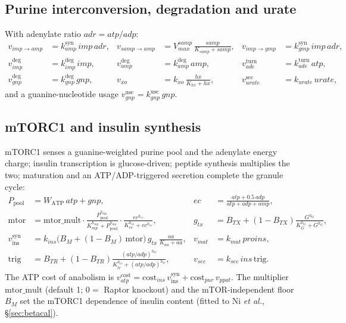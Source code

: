 \documentclass[11pt]{article}
\begin{document}
\subsection{Purine interconversion, degradation and urate}
With adenylate ratio $adr=atp/adp$:
\begin{align}
v_{imp\to amp}&=k_{amp}^{\mathrm{syn}}\,imp\,adr, &
v_{samp\to amp}&=V_{max}^{samp}\,\frac{samp}{K_{samp}+samp}, &
v_{imp\to gmp}&=k_{gmp}^{\mathrm{syn}}\,imp\,adr,\\
v_{imp}^{\mathrm{deg}}&=k_{imp}^{\mathrm{deg}}\,imp, &
v_{amp}^{\mathrm{deg}}&=k_{amp}^{\mathrm{deg}}\,amp, &
v_{ade}^{\mathrm{turn}}&=k_{ade}^{\mathrm{turn}}\,atp,\\
v_{gnp}^{\mathrm{deg}}&=k_{gnp}^{\mathrm{deg}}\,gnp, &
v_{xo}&=k_{xo}\,\frac{hx}{K_{hx}+hx}, &
v_{urate}^{\mathrm{sec}}&=k_{urate}\,urate,
\end{align}
and a guanine-nucleotide usage $v_{gnp}^{\mathrm{use}}=k_{gnp}^{\mathrm{use}}\,gnp$.

\subsection{mTORC1 and insulin synthesis}
mTORC1 senses a guanine-weighted purine pool and the adenylate energy charge;
insulin transcription is glucose-driven; peptide synthesis multiplies the two;
maturation and an ATP/ADP-triggered secretion complete the granule cycle:
\begin{align}
P_{\mathrm{pool}}&=W_{\mathrm{ATP}}\,atp+gnp, &
ec&=\frac{atp+0.5\,adp}{atp+adp+amp},\\
\mathrm{mtor}&=\mathrm{mtor\_mult}\cdot
\frac{P_{\mathrm{pool}}^{h_{mp}}}{K_{mp}^{h_{mp}}+P_{\mathrm{pool}}^{h_{mp}}}\cdot
\frac{ec^{h_{ec}}}{K_{ec}^{h_{ec}}+ec^{h_{ec}}}, &
g_{tx}&=B_{TX}+(1-B_{TX})\frac{G^{h_G}}{K_{G}^{h_G}+G^{h_G}},\\
v_{\mathrm{ins}}^{\mathrm{syn}}&=k_{ins}\big(B_{M}+(1-B_{M})\,\mathrm{mtor}\big)\,g_{tx}\,\frac{aa}{K_{aa}+aa}, &
v_{mat}&=k_{mat}\,proins,\\
\mathrm{trig}&=B_{TR}+(1-B_{TR})\frac{(atp/adp)^{h_{tr}}}{K_{tr}^{h_{tr}}+(atp/adp)^{h_{tr}}}, &
v_{sec}&=k_{sec}\,ins\,\mathrm{trig}.
\end{align}
The ATP cost of anabolism is
$v_{atp}^{\mathrm{cost}}=\mathrm{cost}_{ins}\,v_{\mathrm{ins}}^{\mathrm{syn}}+\mathrm{cost}_{pur}\,v_{ppat}$.
The multiplier $\mathrm{mtor\_mult}$ (default 1; $0=$ Raptor knockout) and the
mTOR-independent floor $B_M$ set the mTORC1 dependence of insulin content
(fitted to Ni \textit{et al.}, \S\ref{sec:betacal}).
\end{document}
